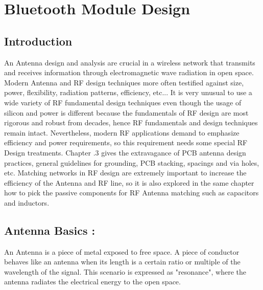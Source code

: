 
\chapter{Bluetooth Module Design}

\section{Introduction}


An Antenna design and analysis are crucial in a wireless network that transmits and receives information through electromagnetic wave radiation in open space.
Modern Antenna and RF design techniques more often testified against size, power, flexibility, radiation patterns, efficiency, etc...
It is very unusual to use a wide variety of RF fundamental design techniques even though the usage of silicon and power is different because the fundamentals of RF design are most rigorous and robust from decades, hence RF fundamentals and design techniques remain intact. Nevertheless, modern RF applications demand to emphasize efficiency and power requirements, so this requirement needs some special RF Design treatments.
Chapter .3 gives the extravagance of PCB antenna design practices, general guidelines for grounding, PCB stacking, spacings and via holes, etc. Matching networks in RF design are extremely important to increase the efficiency of the Antenna and RF line, so it is also explored in the same chapter how to pick the passive components for RF Antenna matching such as capacitors and inductors.

\section{Antenna Basics :}

An Antenna is a piece of metal exposed to free space. A piece of conductor behaves like an antenna when its length is a certain ratio or multiple of the wavelength of the signal. This scenario is expressed as "resonance", where the antenna radiates the electrical energy to the open space.





